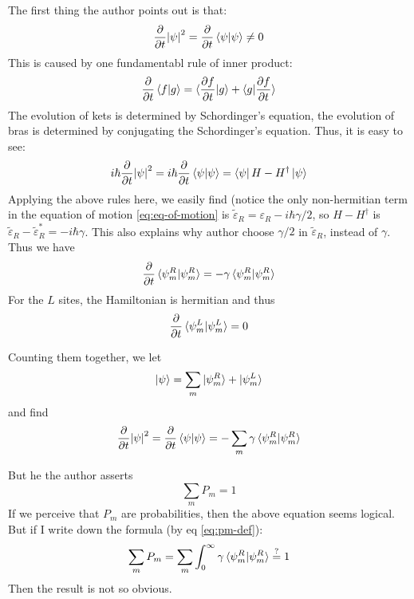\documentclass{article}
\begin{document}
The first thing the author points out is that:
\begin{equation}
    \frac{\partial }{\partial t}\abs{\psi}^2
    = \frac{\partial }{\partial t}  \braket{\psi|\psi} \neq 0
\end{equation}
This is caused by one fundamentabl rule of inner product:
\begin{equation}
    \frac{\partial }{\partial t}\braket{f|g} = 
    \braket{\frac{\partial f}{\partial t}|g} +
    \braket{g| \frac{\partial f}{\partial t}}
\end{equation}
The evolution of kets is determined by Schordinger's equation, the
evolution of bras is determined by conjugating the Schordinger's
equation. Thus, it is easy to see:
\begin{equation}
    \label{eq:pt-norm-1}
    i\hbar \frac{\partial }{\partial t}\abs{\psi}^2 =
    i\hbar \frac{\partial }{\partial t}\braket{\psi|\psi} =
    \bra{\psi} H-H^\dagger \ket{\psi}
\end{equation}
Applying the above rules here, we easily find (notice the only
non-hermitian term in the equation of motion \ref{eq:eq-of-motion} is
$\tilde\varepsilon_R = \varepsilon_R -i\hbar \gamma/2$, so
$H-H^\dagger$ is 
$\tilde\varepsilon_R-\tilde\varepsilon_R^*=-i\hbar\gamma$. This also
explains why author choose $\gamma/2$ in $\tilde\varepsilon_R$,
instead of $\gamma$. Thus we have
\begin{align}
    \label{eq:pt-norm-2}
    \frac{\partial }{\partial t}\braket{\psi^R_m|\psi^R_m} = 
    -\gamma \braket{\psi^R_m|\psi^R_m}
\end{align}
For the $L$ sites, the Hamiltonian is hermitian and thus
\begin{align}
    \frac{\partial }{\partial t}\braket{\psi^L_m|\psi^L_m} = 0
\end{align}

Counting them together, we let
\begin{equation}
    \ket{\psi} = \sum_m \ket{\psi^R_m} + \ket{\psi^L_m}
\end{equation}
and find
\begin{equation}
    \frac{\partial }{\partial t}\abs{\psi}^2 =
    \frac{\partial }{\partial t}\braket{\psi|\psi} =
    - \sum_m \gamma\braket{\psi^R_m|\psi^R_m}
\end{equation}

But he the author asserts
\begin{equation}
    \sum_m P_m = 1
\end{equation}
If we perceive that $P_m$ are probabilities, then the above equation
seems logical. But if I write down the formula (by eq \ref{eq:pm-def}):
\begin{equation}
    \sum_m P_m = \sum_m \int_0^\infty \gamma\braket{\psi^R_m|\psi^R_m}
    \overset{?}{=}1
\end{equation}
Then the result is not so obvious.\label{confusion:1}
\end{document}
